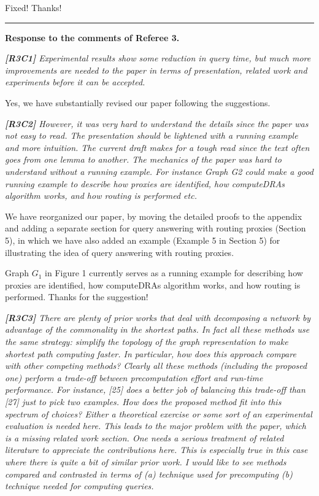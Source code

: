 \documentclass[11pt]{letter}
\newcommand{\vs}{\vspace{1ex}}
\newcommand{\svs}{\vspace{0.36ex}}
\begin{document}
\svs
Fixed! Thanks!










\vspace{2.8ex}
\hrule
\vspace{0.6ex}
{\bf Response to the comments of Referee 3.}


\vs
\noindent
{\em{\bf[R3C1]}
Experimental results show some reduction in query time, but much more improvements are needed to the paper in terms of presentation, related work and experiments before it can be accepted.}
\svs

Yes, we have substantially revised our paper following the suggestions.



\vs
\noindent
{\em{\bf[R3C2]}  However, it was very hard to understand the details since the paper was not easy to read. The presentation should be lightened with a running example and more intuition.  The current draft makes for a tough read since the text often goes from one lemma to another. The mechanics of the paper was hard to understand without a running example.  For instance Graph G2 could make a good running example to describe how proxies are identified, how computeDRAs algorithm works, and how routing is performed etc.}
\svs

We have reorganized our paper, by moving the detailed proofs to the appendix and adding a separate section for query answering with routing proxies (Section 5), in which we have also added an example (Example 5 in Section 5) for illustrating the idea of query answering with routing proxies.

Graph $G_1$ in Figure 1 currently serves as a running example for describing how proxies are identified, how computeDRAs algorithm works, and how routing is performed.  Thanks for the suggestion!


\vs
\noindent
{\em{\bf[R3C3]} There are plenty of prior works that deal with decomposing a network by advantage of the commonality in the shortest paths. In fact all these methods use the same strategy: simplify the topology of the graph representation to make shortest path computing faster. In particular, how does this approach compare with other competing methods? Clearly all these methods (including the proposed one) perform a trade-off between precomputation effort and run-time performance. For instance, [25] does a better job of balancing this trade-off than [27] just to pick two examples. How does the proposed method fit into this spectrum of choices? Either a theoretical exercise or some sort of an experimental evaluation is needed here. This leads to the major problem with the paper, which is a missing related work section.  One needs a serious treatment of related literature to appreciate the contributions here. This is especially true in this case where there is quite a bit of similar prior work. I would like to see methods compared and contrasted in terms of (a) technique used for precomputing (b) technique needed for computing queries.}
\svs
\end{document}
